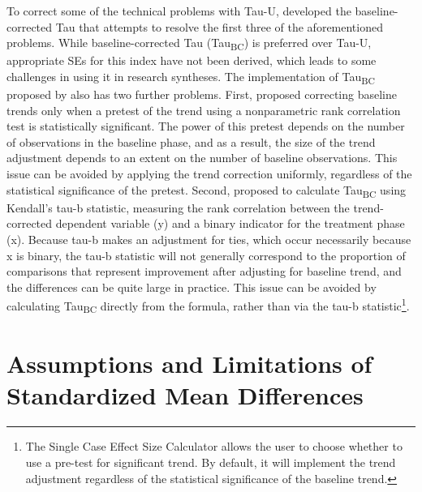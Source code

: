 \documentclass[
]{book}
\begin{document}
To correct some of the technical problems with Tau-U, \citet{Tarlow_2017} developed the baseline-corrected Tau \citep{Tarlow_2017} that attempts to resolve the first three of the aforementioned problems. While baseline-corrected Tau (Tau\textsubscript{BC}) is preferred over Tau-U, appropriate SEs for this index have not been derived, which leads to some challenges in using it in research syntheses. The implementation of Tau\textsubscript{BC} proposed by \citet{Tarlow_2017} also has two further problems. First, \citet{Tarlow_2017} proposed correcting baseline trends only when a pretest of the trend using a nonparametric rank correlation test is statistically significant. The power of this pretest depends on the number of observations in the baseline phase, and as a result, the size of the trend adjustment depends to an extent on the number of baseline observations. This issue can be avoided by applying the trend correction uniformly, regardless of the statistical significance of the pretest. Second, \citet{Tarlow_2017} proposed to calculate Tau\textsubscript{BC} using Kendall's tau-b statistic, measuring the rank correlation between the trend-corrected dependent variable (y) and a binary indicator for the treatment phase (x). Because tau-b makes an adjustment for ties, which occur necessarily because x is binary, the tau-b statistic will not generally correspond to the proportion of comparisons that represent improvement after adjusting for baseline trend, and the differences can be quite large in practice. This issue can be avoided by calculating Tau\textsubscript{BC} directly from the formula, rather than via the tau-b statistic\footnote{The Single Case Effect Size Calculator \citep{pustejovsky2023SingleCaseES} allows the user to choose whether to use a pre-test for significant trend. By default, it will implement the trend adjustment regardless of the statistical significance of the baseline trend.}.

\hypertarget{assumptions-and-limitations-of-standardized-mean-differences}{%
\section{Assumptions and Limitations of Standardized Mean Differences}\label{assumptions-and-limitations-of-standardized-mean-differences}}
\end{document}
